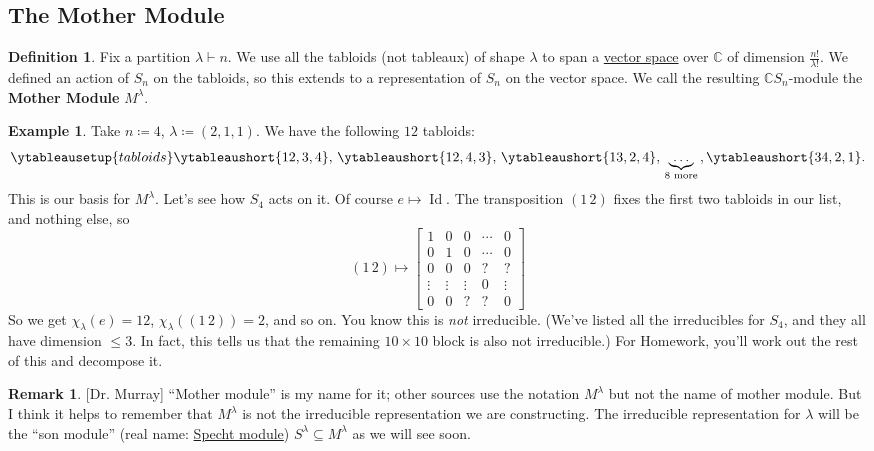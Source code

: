 \documentclass[12pt]{article}
\newcommand{\cx}{\mathbb{C}}
\newcommand{\ita}[1]{\textit{#1}}
\newcommand\paren[1]{\left( #1 \right)}
\theoremstyle{definition}
\newtheorem{definition}[theorem]{Definition}
\newtheorem*{remark}{Remark}
\newtheorem{example}{Example}[section]
\DeclareMathOperator\Id{Id}
\begin{document}
\subsection{The Mother Module}
\begin{definition}
    Fix a partition $\lambda \vdash n$. We use all the tabloids (not tableaux) of shape $\lambda$ to span a \underline{vector space} over $\cx$ of dimension $\frac{n!}{\lambda!}$. We defined an action of $S_n$ on the tabloids, so this extends to a representation of $S_n$ on the vector space. We call the resulting $\cx S_n$-module the \textbf{Mother Module} $M^{\lambda}$.
\end{definition}
\begin{example}
    Take $n \coloneqq  4$, $\lambda \coloneqq  (2,1,1)$. We have the following $12$ tabloids:
    \begin{equation}
        \ytableausetup{tabloids}
        \ytableaushort{12,3,4}, \, \ytableaushort{12,4,3}, \, \ytableaushort{13,2,4}, \, \underbrace{\dotsc}_{ \text{8 more} } \, , \ytableaushort{34,2,1}.
    \end{equation}
    This is our basis for $M^{\lambda}$. Let's see how $S_4$ acts on it. Of course $e \mapsto \Id$. The transposition $(1\,2)$ fixes the first two tabloids in our list, and nothing else, so 
    \begin{equation}
        (1\,2) \mapsto 
        \left[ 
            \begin{array}{cc|ccc}
                1 & 0 & 0 & \cdots & 0 \\
                0 & 1 & 0 & \cdots & 0 \\
                \hline
                0 & 0 & 0 & ? & ? \\
                \vdots & \vdots & \vdots & 0 & \vdots \\
                0 & 0 & ? & ? & 0
            \end{array}
        \right]
    \end{equation}
    So we get $\chi_{\lambda}(e) = 12$, $\chi_{\lambda} \paren{ (1\,2) } = 2$, and so on. You know this is \ita{not} irreducible. (We've listed all the irreducibles for $S_4$, and they all have dimension $\leq 3$. In fact, this tells us that the remaining $10 \times 10$ block is also not irreducible.) For Homework, you'll work out the rest of this and decompose it.
\end{example}
\begin{remark}
    {
        \color{blue}
        [Dr. Murray] ``Mother module'' is my name for it; other sources use the notation $M^{\lambda}$ but not the name of mother module. But I think it helps to remember that $M^{\lambda}$ is not the irreducible representation we are constructing. The irreducible representation for $\lambda$ will be the ``son module'' (real name: \underline{Specht module}) $S^{\lambda} \subseteq M^{\lambda}$ as we will see soon.
    }
\end{remark}
\end{document}
